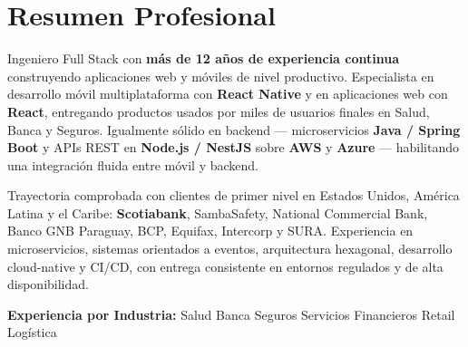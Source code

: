 
\section{Resumen Profesional}

Ingeniero Full Stack con \textbf{más de 12 años de experiencia continua} construyendo aplicaciones
web y móviles de nivel productivo. Especialista en desarrollo móvil multiplataforma con
\textbf{React Native} y en aplicaciones web con \textbf{React}, entregando productos usados por
miles de usuarios finales en Salud, Banca y Seguros. Igualmente sólido en backend ---
microservicios \textbf{Java / Spring Boot} y APIs REST en \textbf{Node.js / NestJS} sobre
\textbf{AWS} y \textbf{Azure} --- habilitando una integración fluida entre móvil y backend.

\vspace{3pt}

Trayectoria comprobada con clientes de primer nivel en Estados Unidos, América Latina y el Caribe:
\textbf{Scotiabank}, SambaSafety, National Commercial Bank, Banco GNB Paraguay, BCP, Equifax,
Intercorp y SURA. Experiencia en microservicios, sistemas orientados a eventos, arquitectura
hexagonal, desarrollo cloud-native y CI/CD, con entrega consistente en entornos regulados y de
alta disponibilidad.

\vspace{4pt}
{\small\color{cvMuted}%
  \textbf{Experiencia por Industria:}\enspace%
  Salud\enspace\textbar\enspace
  Banca\enspace\textbar\enspace
  Seguros\enspace\textbar\enspace
  Servicios Financieros\enspace\textbar\enspace
  Retail\enspace\textbar\enspace
  Logística%
}
